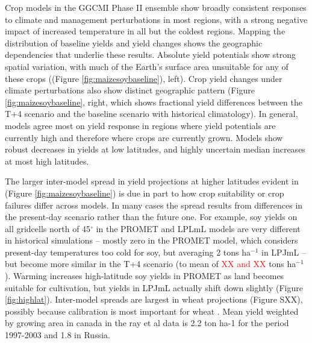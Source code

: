 \documentclass[gmd, manuscript]{copernicus} %
\begin{document}
Crop models in the GGCMI Phase II ensemble show broadly consistent responses to climate and management perturbations in most regions, with a strong negative impact of increased temperature in all but the coldest regions. 
Mapping the distribution of baseline yields and yield changes shows the geographic dependencies that underlie these results. 
Absolute yield potentials show strong spatial variation, with much of the Earth's surface area unsuitable for any of these crops ((Figure \ref{fig:maizesoybaseline}), left).
Crop yield changes under climate perturbations also show distinct geographic pattern (Figure \ref{fig:maizesoybaseline}, right, which shows fractional yield differences between the T+4 scenario and the baseline scenario with historical climatology).
In general, models agree most on yield response in regions where yield potentials are currently high and therefore where crops are currently grown. 
Models show robust decreases in yields at low latitudes, and highly uncertain median increases at most high latitudes. 

The larger inter-model spread in yield projections at higher latitudes evident in (Figure \ref{fig:maizesoybaseline}) is due in part to how crop suitability or crop failures differ across models. In many cases the spread results from differences in the present-day scenario rather than the future one.  For example, soy yields on all gridcells north of 45$^\circ$ in the PROMET and LPLmL models are very different in historical simulations -- mostly zero in the PROMET model, which considers present-day temperatures too cold for soy, but averaging 2 tons ha$^{-1}$ in LPJmL -- but become more similar in the T+4 scenario (to mean of \textcolor{red}{XX and XX} tons ha$^{-1}$). 
Warming increases high-latitude soy yields in PROMET as land becomes suitable for cultivation, but yields in LPJmL actually shift down slightly (Figure \ref{fig:highlat}). Inter-model spreads are largest in wheat projections (Figure SXX), possibly because calibration is most important for wheat \citep[e.g.][]{Asseng2013}.
Mean yield weighted by growing area in canada in the ray et al data is 2.2 ton ha-1 for the period 1997-2003 and 1.8 in Russia.
\end{document}
